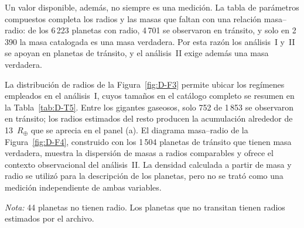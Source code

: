 Un valor disponible, además, no siempre es una medición. La tabla de parámetros compuestos completa los radios y las masas que faltan con una relación masa--radio: de los 6\,223 planetas con radio, 4\,701 se observaron en tránsito, y solo en 2\,390 la masa catalogada es una masa verdadera. Por esta razón los análisis~I y~II se apoyan en planetas de tránsito, y el análisis~II exige además una masa verdadera.

La distribución de radios de la Figura~\ref{fig:D-F3} permite ubicar los regímenes empleados en el análisis~I, cuyos tamaños en el catálogo completo se resumen en la Tabla~\ref{tab:D-T5}. Entre los gigantes gaseosos, solo 752 de 1\,853 se observaron en tránsito; los radios estimados del resto producen la acumulación alrededor de 13~$R_\oplus$ que se aprecia en el panel (a). El diagrama masa--radio de la Figura~\ref{fig:D-F4}, construido con los 1\,504 planetas de tránsito que tienen masa verdadera, muestra la dispersión de masas a radios comparables y ofrece el contexto observacional del análisis~II. La densidad calculada a partir de masa y radio se utilizó para la descripción de los planetas, pero no se trató como una medición independiente de ambas variables.

\begin{table}[htbp]
    \centering
    \caption{Regímenes de radio en el catálogo limpio: criterio, número de planetas y medianas de las propiedades planetarias y estelares.}
    \label{tab:D-T5}
    \small
    \par\smallskip
    {\footnotesize\textit{Nota:} 44 planetas no tienen radio. Los planetas que no transitan tienen radios estimados por el archivo.}
\end{table}

